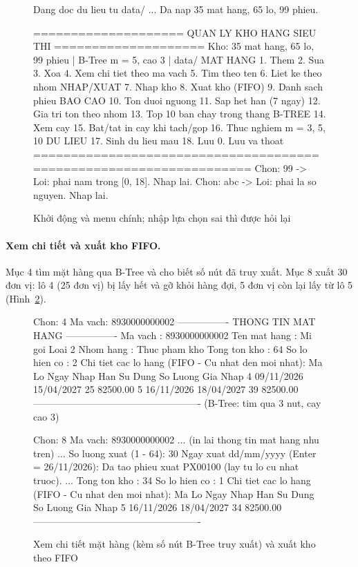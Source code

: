 \begin{figure}[htbp]
\begin{manhinh}
Dang doc du lieu tu data/ ...
Da nap 35 mat hang, 65 lo, 99 phieu.

==================== QUAN LY KHO HANG SIEU THI ====================
 Kho: 35 mat hang, 65 lo, 99 phieu | B-Tree m = 5, cao 3 | data/
 MAT HANG   1. Them   2. Sua   3. Xoa   4. Xem chi tiet theo ma vach
            5. Tim theo ten   6. Liet ke theo nhom
 NHAP/XUAT  7. Nhap kho   8. Xuat kho (FIFO)   9. Danh sach phieu
 BAO CAO    10. Ton duoi nguong   11. Sap het han (7 ngay)
            12. Gia tri ton theo nhom   13. Top 10 ban chay trong thang
 B-TREE     14. Xem cay   15. Bat/tat in cay khi tach/gop   16. Thuc nghiem m = 3, 5, 10
 DU LIEU    17. Sinh du lieu mau   18. Luu   0. Luu va thoat
===================================================================
Chon: 99
  -> Loi: phai nam trong [0, 18]. Nhap lai.
Chon: abc
  -> Loi: phai la so nguyen. Nhap lai.
\end{manhinh}
\caption{Khởi động và menu chính; nhập lựa chọn sai thì được hỏi lại}
\label{fig:menu}
\end{figure}

\paragraph{Xem chi tiết và xuất kho FIFO.} Mục 4 tìm mặt hàng qua B-Tree và cho biết số nút đã truy xuất.
Mục 8 xuất 30 đơn vị: lô 4 (25 đơn vị) bị lấy hết và gỡ khỏi hàng đợi, 5 đơn vị còn lại lấy từ lô 5
(Hình~\ref{fig:xuatkho}).

\begin{figure}[htbp]
\begin{manhinh}
Chon: 4
Ma vach: 8930000000002
---------------- THONG TIN MAT HANG ----------------
Ma vach         : 8930000000002
Ten mat hang    : Mi goi Loai 2
Nhom hang       : Thuc pham kho
Tong ton kho    : 64
So lo hien co   : 2
Chi tiet cac lo hang (FIFO - Cu nhat den moi nhat):
  Ma Lo   Ngay Nhap     Han Su Dung   So Luong  Gia Nhap
  4       09/11/2026    15/04/2027    25        82500.00
  5       16/11/2026    18/04/2027    39        82500.00
----------------------------------------------------
(B-Tree: tim qua 3 nut, cay cao 3)

Chon: 8
Ma vach: 8930000000002
   ... (in lai thong tin mat hang nhu tren) ...
So luong xuat (1 - 64): 30
Ngay xuat dd/mm/yyyy (Enter = 26/11/2026):
Da tao phieu xuat PX00100 (lay tu lo cu nhat truoc).
   ...
Tong ton kho    : 34
So lo hien co   : 1
Chi tiet cac lo hang (FIFO - Cu nhat den moi nhat):
  Ma Lo   Ngay Nhap     Han Su Dung   So Luong  Gia Nhap
  5       16/11/2026    18/04/2027    34        82500.00
----------------------------------------------------
\end{manhinh}
\caption{Xem chi tiết mặt hàng (kèm số nút B-Tree truy xuất) và xuất kho theo FIFO}
\label{fig:xuatkho}
\end{figure}

